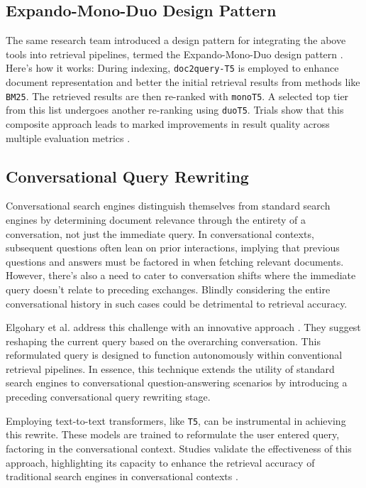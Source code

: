 \documentclass[sigconf]{acmart}
\begin{document}
\subsection{Expando-Mono-Duo Design Pattern}\label{sec:expando}
The same research team introduced a design pattern for integrating the above tools into retrieval pipelines, termed the Expando-Mono-Duo design pattern \cite{pradeep2021expando}. Here's how it works: During indexing, \texttt{doc2query-T5} is employed to enhance document representation and better the initial retrieval results from methods like \texttt{BM25}. The retrieved results are then re-ranked with \texttt{monoT5}. A selected top tier from this list undergoes another re-ranking using \texttt{duoT5}. Trials show that this composite approach leads to marked improvements in result quality across multiple evaluation metrics \cite{pradeep2021expando}.

\subsection{Conversational Query Rewriting}\label{sec:cqr}
Conversational search engines distinguish themselves from standard search engines by determining document relevance through the entirety of a conversation, not just the immediate query. In conversational contexts, subsequent questions often lean on prior interactions, implying that previous questions and answers must be factored in when fetching relevant documents. However, there's also a need to cater to conversation shifts where the immediate query doesn't relate to preceding exchanges. Blindly considering the entire conversational history in such cases could be detrimental to retrieval accuracy.

Elgohary et al. address this challenge with an innovative approach \cite{elgohary2019can}. They suggest reshaping the current query based on the overarching conversation. This reformulated query is designed to function autonomously within conventional retrieval pipelines. In essence, this technique extends the utility of standard search engines to conversational question-answering scenarios by introducing a preceding conversational query rewriting stage.

Employing text-to-text transformers, like \texttt{T5}, can be instrumental in achieving this rewrite. These models are trained to reformulate the user entered query, factoring in the conversational context. Studies validate the effectiveness of this approach, highlighting its capacity to enhance the retrieval accuracy of traditional search engines in conversational contexts \cite{elgohary2019can,anantha2020open,Lajewska:2023:ECIR}.
\end{document}
